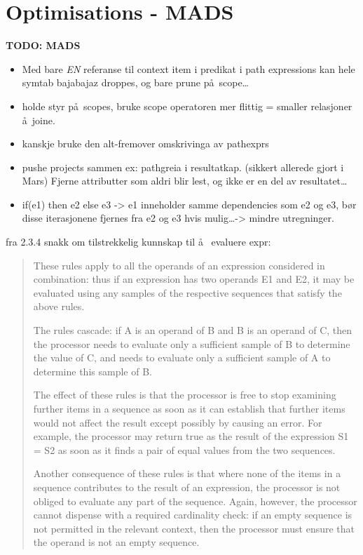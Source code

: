 \section{Optimisations - {MADS}}
\label{sect:disc:optimisations}
\textbf{\LARGE TODO: {MADS}}
\begin{itemize}
  \item Med bare \emph{EN} referanse til context item i predikat i path expressions kan hele symtab bajabajaz
  droppes, og bare prune p\aa~scope\ldots
  \item holde styr p\aa~scopes, bruke scope operatoren mer flittig = smaller relasjoner \aa~joine.
  \item kanskje bruke den alt-fremover omskrivinga av pathexprs
  \item pushe projects sammen ex: pathgreia i resultatkap. (sikkert allerede gjort i Mars) Fjerne attributter som
  aldri blir lest, og ikke er en del av resultatet\ldots
  \item if(e1) then e2 else e3 -> e1 inneholder samme dependencies som e2 og e3, b\o r disse iterasjonene fjernes
  fra e2 og e3 hvis mulig\ldots -> mindre utregninger.
\end{itemize}

fra 2.3.4 snakk om tilstrekkelig kunnskap til \aa~ evaluere expr:
\begin{quote}
These rules apply to all the operands of an expression considered in combination: thus if an expression has two
operands E1 and E2, it may be evaluated using any samples of the respective sequences that satisfy the above rules.

The rules cascade: if A is an operand of B and B is an operand of C, then the processor needs to evaluate only a
sufficient sample of B to determine the value of C, and needs to evaluate only a sufficient sample of A to
determine this sample of B.

The effect of these rules is that the processor is free to stop examining further items in a sequence as soon as
it can establish that further items would not affect the result except possibly by causing an error. For example,
the processor may return true as the result of the expression S1 = S2 as soon as it finds a pair of equal values
from the two sequences.

Another consequence of these rules is that where none of the items in a sequence contributes to the result of an
expression, the processor is not obliged to evaluate any part of the sequence. Again, however, the processor
cannot dispense with a required cardinality check: if an empty sequence is not permitted in the relevant context,
then the processor must ensure that the operand is not an empty sequence.
\end{quote}